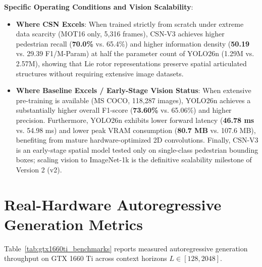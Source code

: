 \documentclass[11pt,a4paper]{article}
\begin{document}
\textbf{Specific Operating Conditions and Vision Scalability}:
\begin{itemize}[leftmargin=*]
    \item \textbf{Where CSN Excels}: When trained strictly from scratch under extreme data scarcity (MOT16 only, 5,316 frames), CSN-V3 achieves higher pedestrian recall (\textbf{70.0\%} vs. 65.4\%) and higher information density (\textbf{50.19} vs. 29.39 F1/M-Param) at half the parameter count of YOLO26n (1.29M vs. 2.57M), showing that Lie rotor representations preserve spatial articulated structures without requiring extensive image datasets.
    \item \textbf{Where Baseline Excels / Early-Stage Vision Status}: When extensive pre-training is available (MS COCO, 118,287 images), YOLO26n achieves a substantially higher overall F1-score (\textbf{73.60\%} vs. 65.06\%) and higher precision. Furthermore, YOLO26n exhibits lower forward latency (\textbf{46.78 ms} vs. 54.98 ms) and lower peak VRAM consumption (\textbf{80.7 MB} vs. 107.6 MB), benefiting from mature hardware-optimized 2D convolutions. Finally, CSN-V3 is an early-stage spatial model tested only on single-class pedestrian bounding boxes; scaling vision to ImageNet-1k is the definitive scalability milestone of Version 2 (v2).
\end{itemize}

\section{Real-Hardware Autoregressive Generation Metrics}

Table~\ref{tab:gtx1660ti_benchmarks} reports measured autoregressive generation throughput on GTX 1660 Ti across context horizons $L \in [128, 2048]$.
\end{document}
